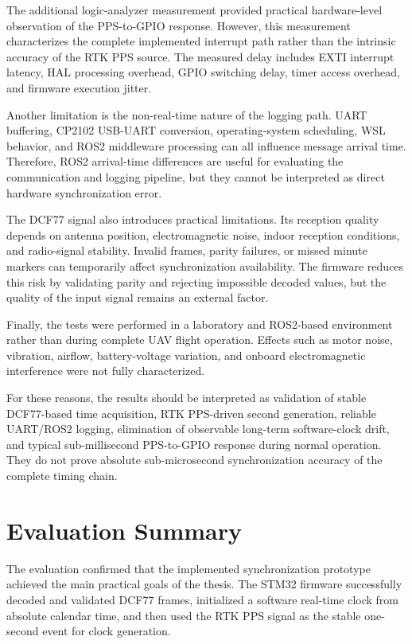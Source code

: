 The additional logic-analyzer measurement provided practical hardware-level observation of the PPS-to-GPIO response. However, this measurement characterizes the complete implemented interrupt path rather than the intrinsic accuracy of the RTK PPS source. The measured delay includes EXTI interrupt latency, HAL processing overhead, GPIO switching delay, timer access overhead, and firmware execution jitter.

Another limitation is the non-real-time nature of the logging path. UART buffering, CP2102 USB-UART conversion, operating-system scheduling, WSL behavior, and ROS2 middleware processing can all influence message arrival time. Therefore, ROS2 arrival-time differences are useful for evaluating the communication and logging pipeline, but they cannot be interpreted as direct hardware synchronization error.

The DCF77 signal also introduces practical limitations. Its reception quality depends on antenna position, electromagnetic noise, indoor reception conditions, and radio-signal stability. Invalid frames, parity failures, or missed minute markers can temporarily affect synchronization availability. The firmware reduces this risk by validating parity and rejecting impossible decoded values, but the quality of the input signal remains an external factor.

Finally, the tests were performed in a laboratory and ROS2-based environment rather than during complete UAV flight operation. Effects such as motor noise, vibration, airflow, battery-voltage variation, and onboard electromagnetic interference were not fully characterized.

For these reasons, the results should be interpreted as validation of stable DCF77-based time acquisition, RTK PPS-driven second generation, reliable UART/ROS2 logging, elimination of observable long-term software-clock drift, and typical sub-millisecond PPS-to-GPIO response during normal operation. They do not prove absolute sub-microsecond synchronization accuracy of the complete timing chain.

\section{Evaluation Summary}

The evaluation confirmed that the implemented synchronization prototype achieved the main practical goals of the thesis. The STM32 firmware successfully decoded and validated DCF77 frames, initialized a software real-time clock from absolute calendar time, and then used the RTK PPS signal as the stable one-second event for clock generation.

